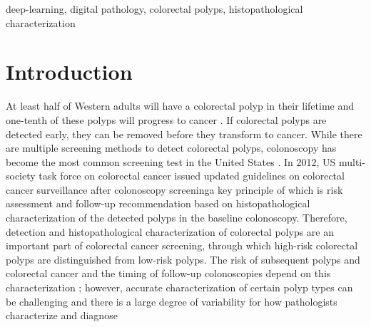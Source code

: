 \documentclass[review]{elsarticle}
\begin{document}
\begin{frontmatter}
\begin{abstract}
\end{abstract}

\begin{keyword}
deep-learning, digital pathology, colorectal polyps, histopathological characterization
\end{keyword}

\end{frontmatter}


\section{Introduction}\label{introduction}
At least half of Western adults will have a colorectal polyp in their
lifetime and one-tenth of these polyps will progress to cancer \citep{wong2009observer}.
If colorectal polyps are detected early, they can be removed before they transform to cancer.
While there are multiple screening methods to detect colorectal polyps, colonoscopy has become
the most common screening test in the United States \citep{lieberman2012guidelines}.
In 2012, US multi-society task force on colorectal cancer issued updated guidelines
on colorectal cancer surveillance after colonoscopy screening\textemdash a key principle of which is risk
assessment and follow-up recommendation based on histopathological characterization of the
detected polyps in the baseline colonoscopy. Therefore, detection and histopathological
characterization of colorectal polyps are an important part of colorectal cancer screening,
through which high-risk colorectal polyps are distinguished from low-risk polyps.
The risk of subsequent polyps and colorectal cancer and the timing of follow-up
colonoscopies depend on this characterization \citep{lieberman2012guidelines}; however,
accurate characterization of certain polyp types can be challenging and there
is a large degree of variability for how pathologists characterize and diagnose
\end{document}
